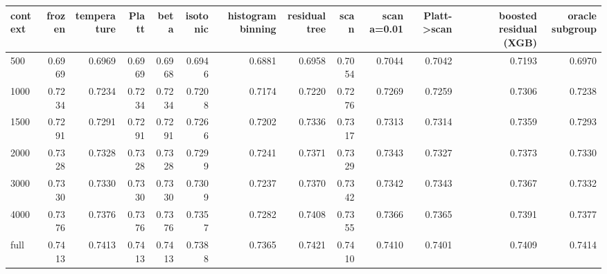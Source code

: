 \begin{tabular}{lrrrrrrrrrrrr}
\toprule
context & frozen & temperature & Platt & beta & isotonic & histogram binning & residual tree & scan & scan a=0.01 & Platt->scan & boosted residual (XGB) & oracle subgroup \\
\midrule
500 & 0.6969 & 0.6969 & 0.6969 & 0.6968 & 0.6946 & 0.6881 & 0.6958 & 0.7054 & 0.7044 & 0.7042 & 0.7193 & 0.6970 \\
1000 & 0.7234 & 0.7234 & 0.7234 & 0.7234 & 0.7208 & 0.7174 & 0.7220 & 0.7276 & 0.7269 & 0.7259 & 0.7306 & 0.7238 \\
1500 & 0.7291 & 0.7291 & 0.7291 & 0.7291 & 0.7266 & 0.7202 & 0.7336 & 0.7317 & 0.7313 & 0.7314 & 0.7359 & 0.7293 \\
2000 & 0.7328 & 0.7328 & 0.7328 & 0.7328 & 0.7299 & 0.7241 & 0.7371 & 0.7329 & 0.7343 & 0.7327 & 0.7373 & 0.7330 \\
3000 & 0.7330 & 0.7330 & 0.7330 & 0.7330 & 0.7309 & 0.7237 & 0.7370 & 0.7342 & 0.7342 & 0.7343 & 0.7367 & 0.7332 \\
4000 & 0.7376 & 0.7376 & 0.7376 & 0.7376 & 0.7357 & 0.7282 & 0.7408 & 0.7355 & 0.7366 & 0.7365 & 0.7391 & 0.7377 \\
full & 0.7413 & 0.7413 & 0.7413 & 0.7413 & 0.7388 & 0.7365 & 0.7421 & 0.7410 & 0.7410 & 0.7401 & 0.7409 & 0.7414 \\
\bottomrule
\end{tabular}
